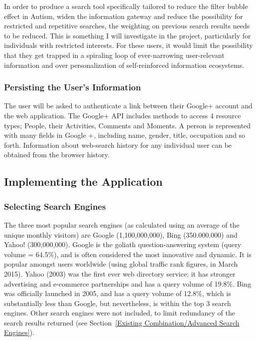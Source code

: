 \documentclass[a4paper, 11pt]{article}
\begin{document}
In order to produce a search tool specifically tailored to reduce the filter bubble effect in Autism, widen the information gateway and reduce the possibility for restricted and repetitive searches, the weighting on previous search results needs to be reduced. This is something I will investigate in the project, particularly for individuals with restricted interests. For these users, it would limit the possibility that they get trapped in a spiraling loop of ever-narrowing user-relevant information and over personalization of self-reinforced information ecosystems.

\subsubsection{Persisting the User's Information}
The user will be asked to authenticate a link between their Google+ account and the web application. The Google+ API includes methods to access 4 resource  types; People, their Activities, Comments and Moments. A person is represented with many fields in Google +, including name, gender, title, occupation and so forth. Information about web-search history for any individual user can be obtained from the browser history. 

\subsection{Implementing the Application}\label{api}
\subsubsection{Selecting Search Engines} 
The three most popular search engines (as calculated using an average of the unique monthly visitors) are Google (1,100,000,000), Bing (350.000.000) and Yahoo! (300,000,000)\cite{ebiz}. Google is the goliath question-answering system (query volume = 64.5\%)\cite{adam}, and is often considered the most innovative and dynamic. It is popular amongst users worldwide (using global traffic rank figures, in March 2015). Yahoo (2003) was the first ever web directory service; it has stronger advertising and e-commerce partnerships and has a query volume of 19.8\%. Bing was officially launched in 2005, and has a query volume of 12.8\%, which is substantially less than Google, but nevertheless, is within the top 3 search engines. Other search engines were not included, to limit redundancy of the search results returned (see Section~\ref{Existing Combination/Advanced Search Engines}). 
\end{document}

